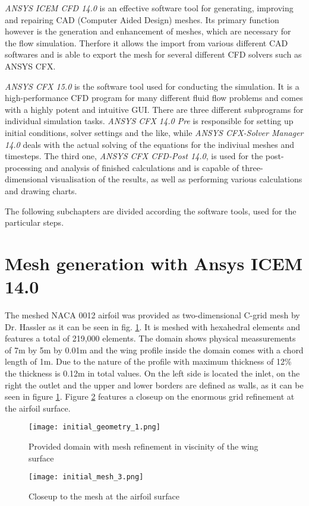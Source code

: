 \emph{ANSYS ICEM CFD 14.0} is an effective software tool for generating, improving and repairing CAD (Computer Aided Design) meshes. Its primary function however is the generation and enhancement of meshes, which are necessary for the flow simulation. Therfore it allows the import from various different CAD softwares and is able to export the mesh for several different CFD solvers such as ANSYS CFX.
	
\emph{ANSYS CFX 15.0} is the software tool used for conducting the simulation. It is a high-performance CFD program for many different fluid flow problems and comes with a highly potent and intuitive GUI. There are three different subprograms for individual simulation tasks. \emph{ANSYS CFX 14.0 Pre} is responsible for setting up initial conditions, solver settings and the like, while \emph{ANSYS CFX-Solver Manager 14.0} deals with the actual solving of the equations for the indiviual meshes and timesteps. The third one, \emph{ANSYS CFX CFD-Post 14.0}, is used for the post-processing and analysis of finished calculations and is capable of three-dimensional visualisation of the results, as well as performing various calculations and drawing charts.

The following subchapters are divided according the software tools, used for the particular steps.
\section{Mesh generation with Ansys ICEM 14.0}
The meshed NACA 0012 airfoil was provided as two-dimensional C-grid mesh by Dr. Hassler as it can be seen in fig. \ref{fig:init_mesh}. It is meshed with hexahedral elements and features a total of 219,000 elements. The domain shows physical meassurements of 7m by 5m by 0.01m and the wing profile inside the domain comes with a chord length of 1m. Due to the nature of the profile with maximum thickness of 12\% the thickness is 0.12m in total values. On the left side is located the inlet, on the right the outlet and the upper and lower borders are defined as walls, as it can be seen in figure \ref{fig:init_mesh}. Figure \ref{fig:mesh_closeup} features a closeup on the enormous grid refinement at the airfoil surface.
\begin{figure}[ht]
\centering
\texttt{[image: initial\_geometry\_1.png]}
\caption{Provided domain with mesh refinement in viscinity of the wing surface}
\label{fig:init_mesh}
\end{figure}

\begin{figure}[ht]
\centering
\texttt{[image: initial\_mesh\_3.png]}
\caption{Closeup to the mesh at the airfoil surface}
\label{fig:mesh_closeup}
\end{figure}

